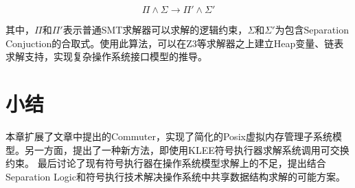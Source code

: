 \begin{equation}
	\Pi \land \Sigma \to \Pi' \land \Sigma'
\end{equation}

其中，$\Pi$和$\Pi'$表示普通SMT求解器可以求解的逻辑约束，$\Sigma$和$\Sigma'$为包含Separation
Conjuction的合取式。使用此算法，可以在Z3等求解器之上建立Heap变量、链表求解支持，实现复杂操作系统接口模型的推导。

\section{小结}
本章扩展了文章\cite{commuter:2013}中提出的Commuter，实现了简化的Posix虚拟内存管理子系统模型。另一方面，提出了一种新方法，即使用KLEE符号执行器求解系统调用可交换约束。
最后讨论了现有符号执行器在操作系统模型求解上的不足，提出结合Separation
Logic和符号执行技术解决操作系统中共享数据结构求解的可能方案。
